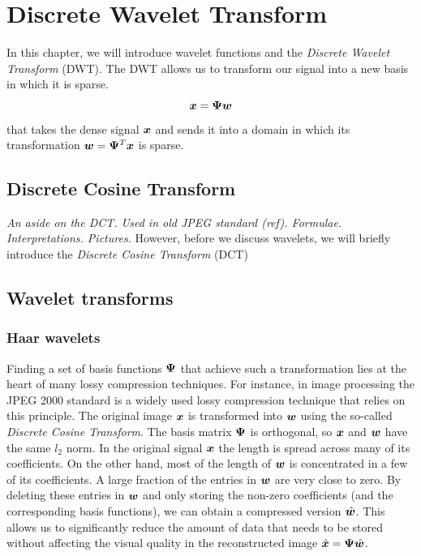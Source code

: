 \chapter{Discrete Wavelet Transform}
In this chapter, we will introduce wavelet functions and the \emph{Discrete Wavelet Transform} (DWT).
The DWT allows us to transform our signal into a new basis in which it is sparse.
\begin{equation}
\boldsymbol x = \boldsymbol \Psi \boldsymbol w
\end{equation}
that takes the dense signal $\boldsymbol x$ and sends it into a domain in which its transformation $\boldsymbol w = \boldsymbol \Psi^T \boldsymbol x$ is sparse.

\section{Discrete Cosine Transform}
\emph{An aside on the DCT. Used in old JPEG standard (ref). Formulae. Interpretations. Pictures.}
However, before we discuss wavelets, we will briefly introduce the \emph{Discrete Cosine Transform} (DCT)

\section{Wavelet transforms}
\subsection{Haar wavelets}
Finding a set of basis functions $\boldsymbol\Psi$ that achieve such a transformation lies at the heart of many lossy compression techniques.
For instance, in image processing the JPEG 2000 standard is a widely used lossy compression technique that relies on this principle.
The original image $\boldsymbol x$ is transformed into $\boldsymbol w$ using the so-called \emph{Discrete Cosine Transform}.
The basis matrix $\boldsymbol \Psi$ is orthogonal, so $\boldsymbol x$ and $\boldsymbol w$ have the same $l_2$ norm.
In the original signal $\boldsymbol x$ the length is spread across many of its coefficients.
On the other hand, most of the length of $\boldsymbol w$ is concentrated in a few of its coefficients.
A large fraction of the entries in $\boldsymbol w$ are very close to zero. 
By deleting these entries in $\boldsymbol w$ and only storing the non-zero coefficients (and the corresponding basis functions), we can obtain a compressed version $\hat{\boldsymbol w}$. 
This allows us to significantly reduce the amount of data that needs to be stored without affecting the visual quality in the reconstructed image $\hat{\boldsymbol x} = \boldsymbol\Psi\hat{\boldsymbol w}$.

